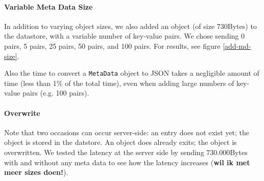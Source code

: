 \paragraph{Variable Meta Data Size}
In addition to varying object sizes, we also added an object (of size 730Bytes)
to the datastore, with a variable number of key-value pairs. We chose sending 0
pairs, 5 pairs, 25 pairs, 50 pairs, and 100 pairs. For results, see figure
\ref{add-md-size}.

Also the time to convert a \texttt{MetaData} object to JSON takes a negligible
amount of time (less than 1\% of the total time), even when adding large numbers
of key-value pairs (e.g. 100 pairs).


\paragraph{Overwrite}
Note that two occasions can occur server-side: an entry does not exist yet; the
object is stored in the datstore. An object does already exits; the object is
overwritten. We tested the latency at the server side by sending 730.000Bytes
with and without any meta data to see how the latency increases (\textbf{wil ik
met meer sizes doen!}).


